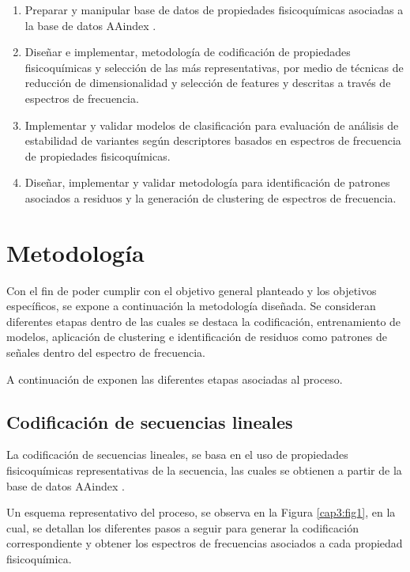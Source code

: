 \begin{enumerate}
	
	\item Preparar y manipular base de datos de propiedades fisicoquímicas asociadas a la base de datos AAindex \cite{Kawashima2000}.
	
	\item Diseñar e implementar, metodología de codificación de propiedades fisicoquímicas y selección de las más representativas, por medio de técnicas de reducción de dimensionalidad y selección de features y descritas a través de espectros de frecuencia.
	
	\item Implementar y validar modelos de clasificación para evaluación de análisis de estabilidad de variantes según descriptores basados en espectros de frecuencia de propiedades fisicoquímicas.
	
	\item Diseñar, implementar y validar metodología para identificación de patrones asociados a residuos y la generación de clustering de espectros de frecuencia.
	
\end{enumerate}

\section{Metodología}

Con el fin de poder cumplir con el objetivo general planteado y los objetivos específicos, se expone a continuación la metodología diseñada. Se consideran diferentes etapas dentro de las cuales se destaca la codificación, entrenamiento de modelos, aplicación de clustering e identificación de residuos como patrones de señales dentro del espectro de frecuencia.

A continuación de exponen las diferentes etapas asociadas al proceso.

\subsection{Codificación de secuencias lineales}

La codificación de secuencias lineales, se basa en el uso de propiedades fisicoquímicas representativas de la secuencia, las cuales se obtienen a partir de la base de datos AAindex \cite{Kawashima2000}.

Un esquema representativo del proceso, se observa en la Figura \ref{cap3:fig1}, en la cual, se detallan los diferentes pasos a seguir para generar la codificación correspondiente y obtener los espectros de frecuencias asociados a cada propiedad fisicoquímica.

